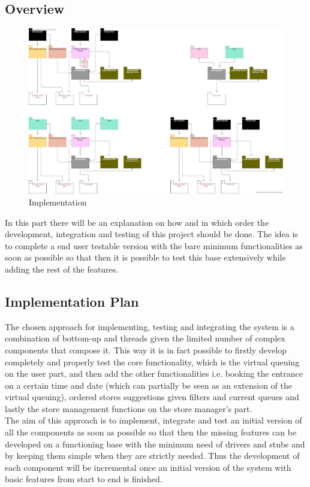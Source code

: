 \subsection{Overview}
\begin{figure}[h!]
	\includegraphics[width=\linewidth]{../Diagrams/Implementation.png}
	\caption{Implementation}
	\label{fig:Implementation1}
\end{figure}
In this part there will be an explanation on how and in which order the development, integration and testing of this project should be done. The idea is to complete a end user testable version with the bare minimum functionalities as soon as possible so that then it is possible to test this base extensively while adding the rest of the features.
\subsection{Implementation Plan}
The chosen approach for implementing, testing and integrating the system is a combination of bottom-up and threads given the limited number of complex components that compose it.
This way it is in fact possible to firstly develop completely and properly test the core functionality, which is the virtual queuing on the user part, and then add the other functionalities i.e. booking the entrance on a certain time and date (which can partially be seen as an extension of the virtual queuing), ordered stores suggestions given filters and current queues and lastly the store management functions on the store manager’s part.\\
The aim of this approach is to implement, integrate and test an initial version of all the components as soon as possible so that then the missing features can be developed on a functioning base with the minimum need of drivers and stubs and by keeping them simple when they are strictly needed.
Thus the development of each component will be incremental once an initial version of the system with basic features from start to end is finished.\\

